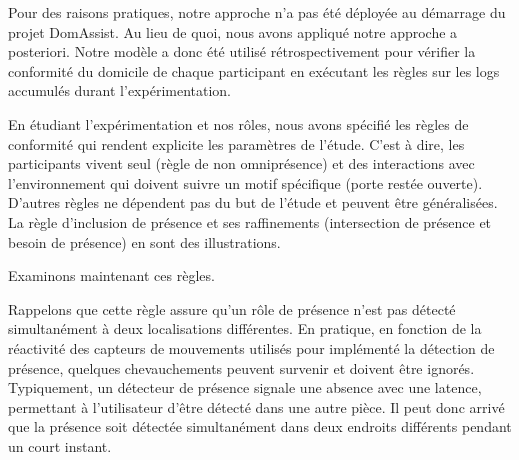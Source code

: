 Pour des raisons pratiques, notre approche n'a pas été déployée au démarrage du projet DomAssist. Au lieu de quoi, nous avons appliqué notre approche a posteriori. Notre modèle a donc été utilisé rétrospectivement pour vérifier la conformité du domicile de chaque participant en exécutant les règles sur les logs accumulés durant l'expérimentation.

En étudiant l'expérimentation et nos rôles, nous avons spécifié les règles de conformité qui rendent explicite les paramètres de l'étude. C'est à dire, les participants vivent seul (règle de non omniprésence) et des interactions avec l'environnement qui doivent suivre un motif spécifique (porte restée ouverte). D'autres règles ne dépendent pas du but de l'étude et peuvent être généralisées. La règle d'inclusion de présence et ses raffinements (intersection de présence et besoin de présence) en sont des illustrations.

Examinons maintenant ces règles.

Rappelons que cette règle assure qu'un rôle de présence n'est pas détecté simultanément à deux localisations différentes. En pratique, en fonction de la réactivité des capteurs de mouvements utilisés pour implémenté la détection de présence, quelques chevauchements peuvent survenir et doivent être ignorés. Typiquement, un détecteur de présence signale une absence avec une latence, permettant à l'utilisateur d'être détecté dans une autre pièce. Il peut donc arrivé que la présence soit détectée simultanément dans deux endroits différents pendant un court instant.



